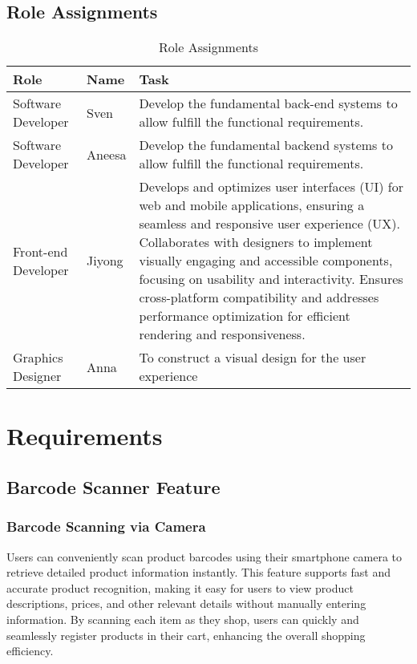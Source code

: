 \documentclass[conference]{IEEEtran}
\begin{document}
\subsection{Role Assignments}
\begin{table}[H]
    \centering
    \caption{Role Assignments}
    \begin{adjustbox}{max width=\textwidth}
        \begin{tabular}{|>{\centering\arraybackslash}m{1.2cm}|>{\centering\arraybackslash}m{1.2cm}|m{5cm}|}
            \hline
            \textbf{ Role} & \textbf{ Name} & \textbf{ Task} \\
            \hline
            Software Developer & Sven & Develop the fundamental back-end systems to allow fulfill the functional requirements. \\
            \hline
            Software Developer & Aneesa & Develop the fundamental backend systems to allow fulfill the functional requirements. \\
            \hline
            Front-end Developer & Jiyong & Develops and optimizes user interfaces (UI) for web and mobile applications, ensuring a seamless and responsive user experience (UX). Collaborates with designers to implement visually engaging and accessible components, focusing on usability and interactivity.
            Ensures cross-platform compatibility and addresses performance optimization for efficient rendering and responsiveness.\\
            \hline
            Graphics Designer & Anna & To construct a visual design for the user experience  \\
            \hline
        \end{tabular}
    \end{adjustbox}
\end{table}

\section{Requirements}

\subsection{Barcode Scanner Feature}
\subsubsection{Barcode Scanning via Camera}
Users can conveniently scan product barcodes using their smartphone camera to retrieve detailed product information instantly. This feature supports fast and accurate product recognition, making it easy for users to view product descriptions, prices, and other relevant details without manually entering information. By scanning each item as they shop, users can quickly and seamlessly register products in their cart, enhancing the overall shopping efficiency.
\end{document}
